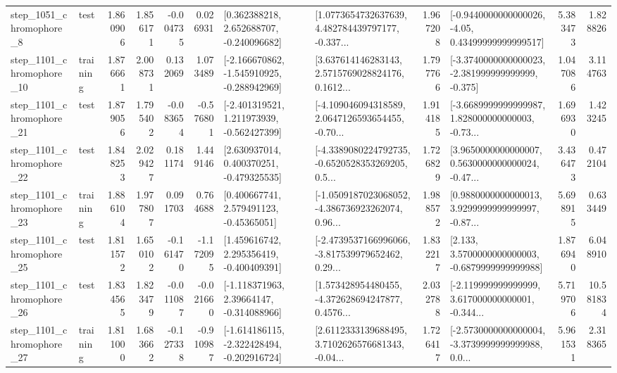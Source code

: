 \begin{tabular}{llrrrrllrlrr}
  step\_1051\_chromophore\_8 &      test &      1.860906 &    1.856171 &     -0.004735 &  0.026931 &    [0.362388218, 2.652688707, -0.240096682] &  [1.0773654732637639, 4.482784439797177, -0.337... &       1.967208 &  [-0.9440000000000026, -4.05, 0.43499999999999517] &            5.383473 &          1.828826 \\
 step\_1101\_chromophore\_10 &  training &      1.876661 &    2.008731 &      0.132069 &  1.073489 &  [-2.166670862, -1.545910925, -0.288942969] &  [3.637614146283143, 2.5715769028824176, 0.1612... &       1.797766 &  [-3.3740000000000023, -2.381999999999999, -0.375] &            1.047086 &          3.114763 \\
 step\_1101\_chromophore\_21 &      test &      1.879056 &    1.795402 &     -0.083654 & -0.576801 &   [-2.401319521, 1.211973939, -0.562427399] &  [-4.109046094318589, 2.0647126593654455, -0.70... &       1.914185 &  [-3.6689999999999987, 1.828000000000003, -0.73... &            1.696930 &          1.423245 \\
 step\_1101\_chromophore\_22 &      test &      1.848253 &    2.029427 &      0.181174 &  1.449146 &    [2.630937014, 0.400370251, -0.479325535] &  [-4.3389080224792735, -0.6520528353269205, 0.5... &       1.726829 &  [3.9650000000000007, 0.5630000000000024, -0.47... &            3.436473 &          0.472104 \\
 step\_1101\_chromophore\_23 &  training &      1.886104 &    1.977807 &      0.091703 &  0.764688 &     [0.400667741, 2.579491123, -0.45365051] &  [-1.0509187023068052, -4.386736923262074, 0.96... &       1.988572 &  [0.9880000000000013, 3.9299999999999997, -0.87... &            5.698915 &          0.633449 \\
 step\_1101\_chromophore\_25 &      test &      1.811572 &    1.650102 &     -0.161470 & -1.172095 &    [1.459616742, 2.295356419, -0.400409391] &  [-2.4739537166996066, -3.817539979652462, 0.29... &       1.832217 &   [2.133, 3.5700000000000003, -0.6879999999999988] &            1.876940 &          6.048910 \\
 step\_1101\_chromophore\_26 &      test &      1.834565 &    1.823479 &     -0.011087 & -0.021660 &    [-1.118371963, 2.39664147, -0.314088966] &  [1.573428954480455, -4.372628694247877, 0.4576... &       2.032788 &  [-2.119999999999999, 3.617000000000001, -0.344... &            5.719706 &         10.581834 \\
 step\_1101\_chromophore\_27 &  training &      1.811000 &    1.683662 &     -0.127338 & -0.910987 &  [-1.614186115, -2.322428494, -0.202916724] &  [2.6112333139688495, 3.7102626576681343, -0.04... &       1.726417 &  [-2.5730000000000004, -3.3739999999999988, 0.0... &            5.961531 &          2.318365 \\

\end{tabular}
